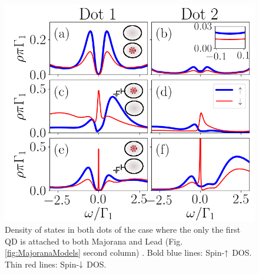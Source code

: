 \documentclass[showpacs,aps,prb,reprint,superscriptaddress]{revtex4-1}
\begin{document}
\begin{figure}[bt]
\begin{center}
\includegraphics[scale=0.45]{Graficos/b)Nt1>0.png}
\caption{  \label{fig:Nt1>0} Density of states in both dots of the case where the only the first QD is attached to both Majorana and Lead (Fig.\ref{fig:MajoranaModels} second column) . Bold blue lines: Spin-$\uparrow$ DOS. Thin red lines: Spin-$\downarrow$ DOS.
}
%
\end{center}
\end{figure}
\end{document}
